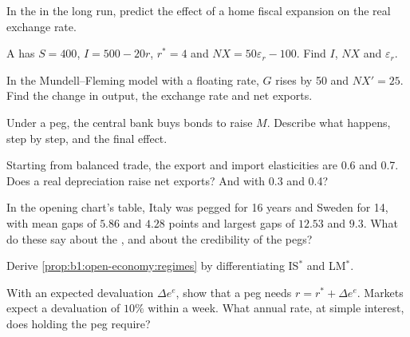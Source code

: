 \begin{exercise}[$\star$]\label{exo:b1:open-economy:predict}
In the  in the long run, predict the effect of a home
fiscal expansion on the real exchange rate.
\end{exercise}

\begin{exercise}[$\star\star$]\label{exo:b1:open-economy:small}
A  has $S = 400$, $I = 500 - 20r$, $r^* = 4$ and $NX = 50\varepsilon_r - 100$. Find
$I$, $NX$ and $\varepsilon_r$.
\end{exercise}

\begin{exercise}[$\star\star$]\label{exo:b1:open-economy:float}
In the Mundell--Fleming model with a floating rate, $G$ rises by 50 and
$NX' = 25$. Find the change in output, the exchange rate and net exports.
\end{exercise}

\begin{exercise}[$\star\star$]\label{exo:b1:open-economy:peg}
Under a peg, the central bank buys bonds to raise $M$. Describe what happens,
step by step, and the final effect.
\end{exercise}

\begin{exercise}[$\star\star$]\label{exo:b1:open-economy:ml}
Starting from balanced trade, the export and import elasticities are 0.6
and 0.7. Does a real depreciation raise net exports? And with 0.3 and 0.4?
\end{exercise}

\begin{exercise}[$\star\star$]\label{exo:b1:open-economy:count}
In the opening chart's table, Italy was pegged for 16 years and Sweden for
14, with mean gaps of $5.86$ and $4.28$ points and largest gaps of $12.53$ and $9.3$.
What do these say about the , and about the credibility of the pegs?
\end{exercise}

\begin{exercise}[$\star\star\star$]\label{exo:b1:open-economy:derive}
Derive \cref{prop:b1:open-economy:regimes} by differentiating IS$^*$ and LM$^*$.
\end{exercise}

\begin{exercise}[$\star\star\star$]\label{exo:b1:open-economy:sweden}
With an expected devaluation $\Delta e^e$, show that a peg needs $r = r^* + \Delta e^e$. Markets
expect a devaluation of $10\%$ within a week. What annual rate, at simple
interest, does holding the peg require?
\end{exercise}

